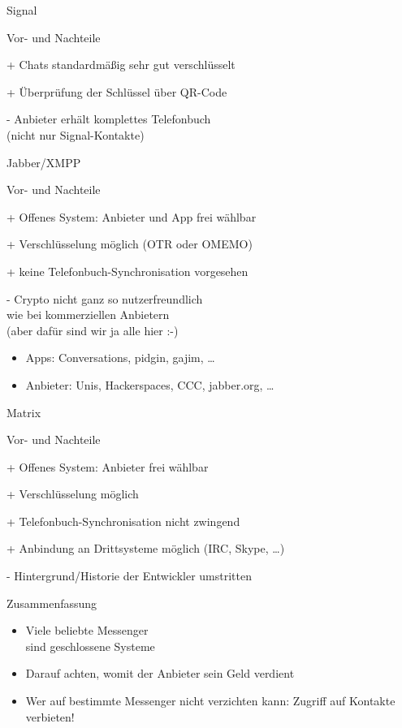 \begin{frame}{Signal}
  \begin{blex}{Vor- und Nachteile}
    \item[+] Chats standardmäßig sehr gut verschlüsselt
    \item[+] Überprüfung der Schlüssel über QR-Code
    \item[-] Anbieter erhält komplettes Telefonbuch\\ (nicht nur Signal-Kontakte)
  \end{blex}
\end{frame}

\begin{frame}{Jabber/XMPP}
  \begin{blex}{Vor- und Nachteile}
    \item[+] Offenes System: Anbieter und App frei wählbar
    \item[+] Verschlüsselung möglich (OTR oder OMEMO)
    \item[+] keine Telefonbuch-Synchronisation vorgesehen
    \item[-] Crypto nicht ganz so nutzerfreundlich\\wie bei kommerziellen Anbietern\\(aber dafür sind wir ja alle hier :-)
  \end{blex}
  \begin{itemize}
    \item Apps: Conversations, pidgin, gajim, \ldots
    \item Anbieter: Unis, Hackerspaces, CCC, jabber.org, \ldots
  \end{itemize}
\end{frame}

\begin{frame}{Matrix}
  \begin{blex}{Vor- und Nachteile}
    \item[+] Offenes System: Anbieter frei wählbar
    \item[+] Verschlüsselung möglich
    \item[+] Telefonbuch-Synchronisation nicht zwingend
    \item[+] Anbindung an Drittsysteme möglich (IRC, Skype, \ldots)
    \item[-] Hintergrund/Historie der Entwickler umstritten
  \end{blex}
\end{frame}

\begin{frame}{Zusammenfassung}
  \begin{itemize}
    \item Viele beliebte Messenger\\ sind geschlossene Systeme
    \item Darauf achten, womit der Anbieter sein Geld verdient
    \item Wer auf bestimmte Messenger nicht verzichten kann: Zugriff auf Kontakte verbieten!
  \end{itemize}
\end{frame}
